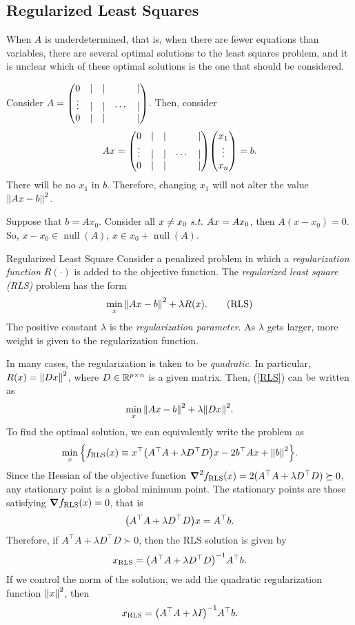 \subsection{Regularized Least Squares}
When $A$ is underdetermined, that is, when there are fewer equations than variables, there are several optimal solutions to the least squares problem, and it is unclear which of these optimal solutions is the one that should be considered.
\begin{eg}{}
	Consider $A=\mqty(0&|&|&&|\\\vdots&|&|&\cdots&|\\0&|&|&&|)$. Then, consider \[Ax=\mqty(0&|&|&&|\\\vdots&|&|&\cdots&|\\0&|&|&&|)\mqty(x_1\\\vdots\\x_n)=b.\] There will be no $x_1$ in $b$. Therefore, changing $x_1$ will not alter the value $\norm{Ax-b}^2$.
\end{eg}
\begin{thm}{}
	Suppose that $b=Ax_0$. Consider all $x\neq x_0\emph{\ s.t.\ } Ax=Ax_0$, then $A(x-x_0)=0$. So, $x-x_0\in\operatorname{null}(A)$, $x\in x_0+\operatorname{null}(A)$.
\end{thm}
\begin{df}{Regularized Least Square}
	Consider a penalized problem in which a \textit{regularization function} $R(\cdot)$ is added to the objective function. The \textit{regularized least square (RLS)} problem has the form \begin{equation}\label{RLS}\min_x\norm{Ax-b}^2+\lambda R(x). \tag{RLS}\end{equation} The positive constant $\lambda$ is the \textit{regularization parameter}. As $\lambda$ gets larger, more weight is given to the regularization function. 
\end{df}

In many cases, the regularization is taken to be \textit{quadratic}. In particular, $R(x)=\norm{Dx}^2$, where $D\in{\mathbb{R}}^{p\times n}$ is a given matrix. Then, (\ref{RLS}) can be written as \[\min_x\norm{Ax-b}^2+\lambda\norm{Dx}^2.\] To find the optimal solution, we can equivalently write the problem as \[\min_x\qty{f_\text{RLS}(x)\equiv x^\top\qty(A^\top A+\lambda D^\top D)x-2b^\top Ax+\norm{b}^2}.\] Since the Hessian of the objective function $\grad^2f_\text{RLS}(x)=2(A^\top A+\lambda D^\top D)\succeq0$, any stationary point is a global minimum point. The stationary points are those satisfying $\grad f_\text{RLS}(x)=0$, that is \[\qty(A^\top A+\lambda D^\top D)x=A^\top b.\] Therefore, if $A^\top A+\lambda D^\top D\succ0$, then the RLS solution is given by \[x_\text{RLS}=\qty(A^\top A+\lambda D^\top D)^{-1}A^\top b.\] If we control the norm of the solution, we add the quadratic regularization function $\norm{x}^2$, then \[x_\text{RLS}=\qty(A^\top A+\lambda I)^{-1}A^\top b.\]

